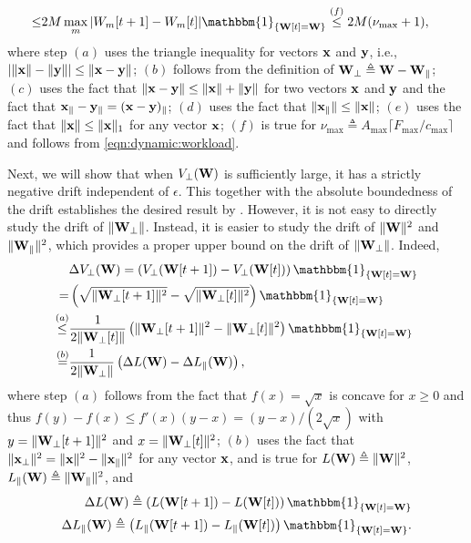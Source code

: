 \documentclass[10pt, conference, letterpaper]{IEEEtran} %
\begin{document}
\begin{IEEEproof}
\begin{align*}
\leq&2M\max_{m}|W_m[t+1]-W_m[t]|\mathbbm{1}_{\{\mb{W}[t]=\mb{W}\}}\stackrel{(f)}{\leq}2M(\nu_{\max}+1),
\end{align*}
where step $(a)$ uses the triangle inequality for vectors $\mathbf{x}$ and $\mathbf{y}$, i.e., $\left|\|\mathbf{x}\|-\|\mathbf{y}\|\right|\leq\|\mathbf{x}-\mathbf{y}\|$; $(b)$ follows from the definition of $\mathbf{W}_{\perp}\triangleq\mathbf{W}-\mathbf{W}_{\parallel}$; $(c)$ uses the fact that $\|\mathbf{x}-\mathbf{y}\|\leq\|\mathbf{x}\|+\|\mathbf{y}\|$ for two vectors $\mathbf{x}$ and $\mathbf{y}$ and the fact that $\mathbf{x}_{\parallel}-\mathbf{y}_{\parallel}=(\mathbf{x}-\mathbf{y})_{\parallel}$; $(d)$ uses the fact that $\|\mathbf{x}_{\parallel}\|\leq\|\mathbf{x}\|$; $(e)$ uses the fact that $\|\mathbf{x}\|\leq\|\mathbf{x}\|_{1}$ for any vector $\mathbf{x}$; $(f)$ is true for $\nu_{\max}\triangleq A_{\max}\lceil F_{\max}/c_{\max}\rceil$ and follows from \eqref{eqn:dynamic:workload}.

Next, we will show that when $V_{\perp}(\mathbf{W})$ is sufficiently large, it has a strictly negative drift independent of $\epsilon$. This together with the absolute boundedness of the drift establishes the desired result by \cite[Theorem 2.3]{haj82}. However, it is not easy to directly study the drift of $\|\mathbf{W}_{\perp}\|$. Instead, it is easier to study the drift of $\|\mathbf{W}\|^2$ and $\|\mathbf{W}_{\parallel}\|^2$, which provides a proper upper bound on the drift of $\|\mathbf{W}_{\perp}\|$. Indeed, 
\begin{align}
\label{eqn:prop:SSC:main}
&\Delta V_{\perp}(\mb{W}) = \left(V_{\perp}(\mb{W}[t+1]) - V_{\perp}(\mb{W}[t])\right)\mathbbm{1}_{\{\mb{W}[t]=\mb{W}\}} \nonumber\\
=&\left(\sqrt{\|\mb{W}_{\perp}[t+1]\|^2} - \sqrt{\|\mb{W}_{\perp}[t]\|^2}\right)\mathbbm{1}_{\{\mb{W}[t]=\mb{W}\}} \nonumber\\
\stackrel{(a)}{\leq}&\frac{1}{2\|\mb{W}_{\perp}[t]\|}\left(\|\mb{W}_{\perp}[t+1]\|^2-\|\mb{W}_{\perp}[t]\|^2\right)\mathbbm{1}_{\{\mb{W}[t]=\mb{W}\}} \nonumber\\
\stackrel{(b)}{=}&\frac{1}{2\|\mb{W}_{\perp}\|}\left(\Delta L(\mb{W})-\Delta L_{\parallel}(\mb{W})\right),
\end{align}
where step $(a)$ follows from the fact that $f(x)=\sqrt{x}$ is concave for $x\geq0$ and thus $f(y)-f(x)\leq f'(x)(y-x)=(y-x)/(2\sqrt{x})$ with $y=\|\mathbf{W}_{\perp}[t+1]\|^2$ and $x=\|\mathbf{W}_{\perp}[t]\|^2$; $(b)$ uses the fact that $\|\mathbf{x}_{\perp}\|^2=\|\mathbf{x}\|^2-\|\mathbf{x}_{\parallel}\|^2$ for any vector $\mathbf{x}$, and is true for $L(\mathbf{W})\triangleq\|\mathbf{W}\|^2$, $L_{\parallel}(\mathbf{W})\triangleq\|\mathbf{W}_{\parallel}\|^2$, and 
\begin{align}
\Delta L(\mb{W})\triangleq \left(L(\mb{W}[t+1])-L(\mb{W}[t])\right)\mathbbm{1}_{\{\mb{W}[t]=\mb{W}\}}\\
\Delta L_{\parallel}(\mb{W})\triangleq \left(L_{\parallel}(\mb{W}[t+1])-L_{\parallel}(\mb{W}[t])\right)\mathbbm{1}_{\{\mb{W}[t]=\mb{W}\}}.
\end{align}


\end{IEEEproof}
\end{document}
